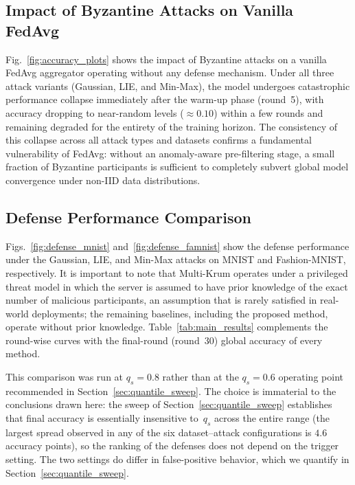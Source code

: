 \documentclass[journal]{IEEEtran}
\begin{document}
\subsection{Impact of Byzantine Attacks on Vanilla FedAvg}

Fig.~\ref{fig:accuracy_plots} shows the impact of Byzantine attacks on a vanilla FedAvg aggregator operating without any defense mechanism. Under all three attack variants (Gaussian, LIE, and Min-Max), the model undergoes catastrophic performance collapse immediately after the warm-up phase (round~5), with accuracy dropping to near-random levels ($\approx 0.10$) within a few rounds and remaining degraded for the entirety of the training horizon. The consistency of this collapse across all attack types and datasets confirms a fundamental vulnerability of FedAvg: without an anomaly-aware pre-filtering stage, a small fraction of Byzantine participants is sufficient to completely subvert global model convergence under non-IID data distributions.


\subsection{Defense Performance Comparison}
\label{sec:defense_comparison}

Figs.~\ref{fig:defense_mnist} and~\ref{fig:defense_famnist} show the defense performance under the Gaussian, LIE, and Min-Max attacks on MNIST and Fashion-MNIST, respectively. It is important to note that Multi-Krum operates under a privileged threat model in which the server is assumed to have prior knowledge of the exact number of malicious participants, an assumption that is rarely satisfied in real-world deployments; the remaining baselines, including the proposed method, operate without prior knowledge. Table~\ref{tab:main_results} complements the round-wise curves with the final-round (round~$30$) global accuracy of every method.

This comparison was run at $q_s = 0.8$ rather than at the $q_s = 0.6$ operating point recommended in Section~\ref{sec:quantile_sweep}. The choice is immaterial to the conclusions drawn here: the sweep of Section~\ref{sec:quantile_sweep} establishes that final accuracy is essentially insensitive to~$q_s$ across the entire range (the largest spread observed in any of the six dataset--attack configurations is $4.6$ accuracy points), so the ranking of the defenses does not depend on the trigger setting. The two settings do differ in false-positive behavior, which we quantify in Section~\ref{sec:quantile_sweep}.
\end{document}
